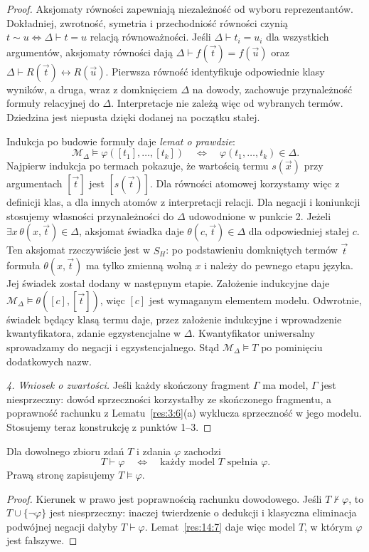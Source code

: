 \begin{proof}
Aksjomaty równości zapewniają niezależność od wyboru reprezentantów. Dokładniej, zwrotność, symetria i przechodniość równości czynią $t\sim u\Longleftrightarrow\Delta\vdash t=u$ relacją równoważności. Jeśli $\Delta\vdash t_i=u_i$ dla wszystkich argumentów, aksjomaty równości dają $\Delta\vdash f(\vec t)=f(\vec u)$ oraz $\Delta\vdash R(\vec t)\leftrightarrow R(\vec u)$. Pierwsza równość identyfikuje odpowiednie klasy wyników, a druga, wraz z domknięciem $\Delta$ na dowody, zachowuje przynależność formuły relacyjnej do $\Delta$. Interpretacje nie zależą więc od wybranych termów. Dziedzina jest niepusta dzięki dodanej na początku stałej.

Indukcja po budowie formuły daje \emph{lemat o prawdzie}:
\[
\mathcal M_\Delta\models\varphi([t_1],\ldots,[t_k])\quad\Longleftrightarrow\quad\varphi(t_1,\ldots,t_k)\in\Delta.
\]
Najpierw indukcja po termach pokazuje, że wartością termu $s(\vec x)$ przy argumentach $[\vec t]$ jest $[s(\vec t)]$. Dla równości atomowej korzystamy więc z definicji klas, a dla innych atomów z interpretacji relacji. Dla negacji i koniunkcji stosujemy własności przynależności do $\Delta$ udowodnione w punkcie 2. Jeżeli $\exists x\,\theta(x,\vec t)\in\Delta$, aksjomat świadka daje $\theta(c,\vec t)\in\Delta$ dla odpowiedniej stałej $c$. Ten aksjomat rzeczywiście jest w $S_H$: po podstawieniu domkniętych termów $\vec t$ formuła $\theta(x,\vec t)$ ma tylko zmienną wolną $x$ i należy do pewnego etapu języka. Jej świadek został dodany w następnym etapie. Założenie indukcyjne daje $\mathcal M_\Delta\models\theta([c],[\vec t])$, więc $[c]$ jest wymaganym elementem modelu. Odwrotnie, świadek będący klasą termu daje, przez założenie indukcyjne i wprowadzenie kwantyfikatora, zdanie egzystencjalne w $\Delta$. Kwantyfikator uniwersalny sprowadzamy do negacji i egzystencjalnego. Stąd $\mathcal M_\Delta\models T$ po pominięciu dodatkowych nazw.

\emph{4. Wniosek o zwartości.} Jeśli każdy skończony fragment $\Gamma$ ma model, $\Gamma$ jest niesprzeczny: dowód sprzeczności korzystałby ze skończonego fragmentu, a poprawność rachunku z Lematu~\ref{res:3:6}(a) wyklucza sprzeczność w jego modelu. Stosujemy teraz konstrukcję z punktów 1--3.
\end{proof}

\begin{wniosek}\label{res:14:8}
Dla dowolnego zbioru zdań $T$ i zdania $\varphi$ zachodzi
\[
T\vdash\varphi\quad\Longleftrightarrow\quad\text{każdy model $T$ spełnia $\varphi$}.
\]
Prawą stronę zapisujemy $T\models\varphi$.
\end{wniosek}
\begin{proof}
Kierunek w prawo jest poprawnością rachunku dowodowego. Jeśli $T\nvdash\varphi$, to $T\cup\{\neg\varphi\}$ jest niesprzeczny: inaczej twierdzenie o dedukcji i klasyczna eliminacja podwójnej negacji dałyby $T\vdash\varphi$. Lemat~\ref{res:14:7} daje więc model $T$, w którym $\varphi$ jest fałszywe.
\end{proof}

